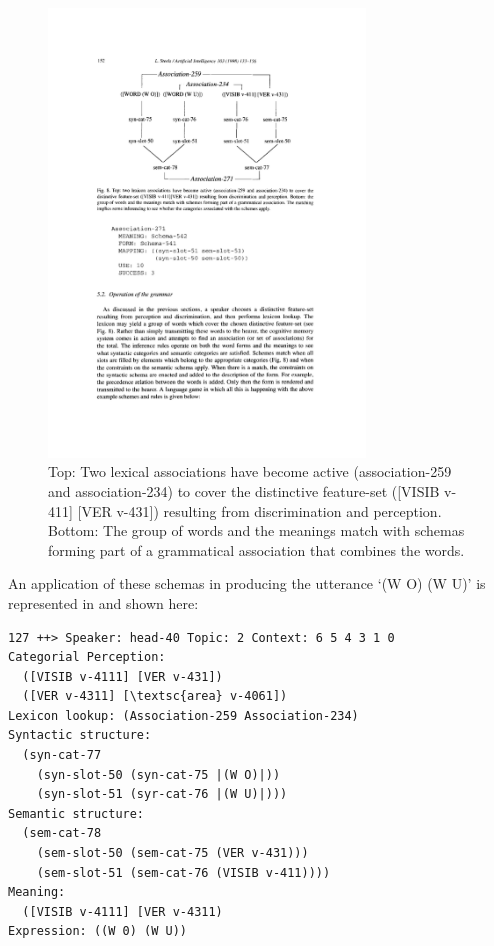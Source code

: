 \begin{figure}[t]
\centerline{
\includegraphics[width=0.75\textwidth]{chap10/figs/associations.pdf}}
\caption{\label{fig:associations}Top: Two lexical associations have become active (association-259 and association-234) to cover the distinctive 
feature-set ([VISIB v-411] [VER v-431]) resulting from discrimination and perception. Bottom: 
The group of words and the meanings match with schemas forming part of a grammatical association that combines the words. }
\end{figure}
An application of these schemas in producing the utterance `(W O) (W U)' is represented in  and shown 
here: 
\begin{verbatim}
127 ++> Speaker: head-40 Topic: 2 Context: 6 5 4 3 1 0
Categorial Perception:
  ([VISIB v-4111] [VER v-431])
  ([VER v-4311] [\textsc{area} v-4061])
Lexicon lookup: (Association-259 Association-234)
Syntactic structure:
  (syn-cat-77
    (syn-slot-50 (syn-cat-75 |(W O)|))
    (syn-slot-51 (syr-cat-76 |(W U)|)))
Semantic structure:
  (sem-cat-78
    (sem-slot-50 (sem-cat-75 (VER v-431)))
    (sem-slot-51 (sem-cat-76 (VISIB v-411))))
Meaning:
  ([VISIB v-4111] [VER v-4311)
Expression: ((W 0) (W U))
\end{verbatim}

